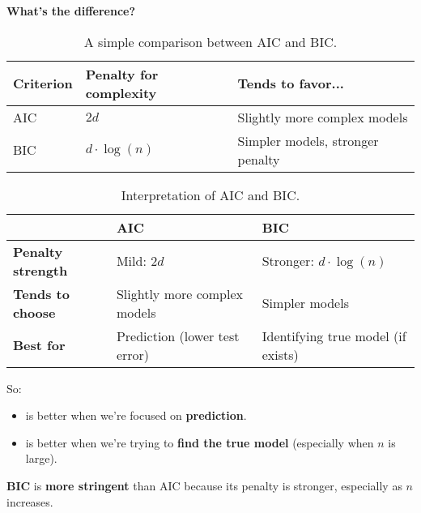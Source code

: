 \highspace
\begin{flushleft}
    \textcolor{Green3}{ \textbf{What's the difference?}}
\end{flushleft}
\begin{table}[!htp]
    \centering
    \begin{tabular}{@{} l l l @{}}
        \toprule
        Criterion & Penalty for complexity & Tends to favor...  \\
        \midrule
        AIC & $2d$          & Slightly more complex models      \\ [.3em]
        BIC & $d \cdot \log(n)$   & Simpler models, stronger penalty  \\
        \bottomrule
    \end{tabular}
    \caption{A simple comparison between AIC and BIC.}
\end{table}

\newpage

\begin{table}[!htp]
    \centering
    \begin{adjustbox}{width={\textwidth},totalheight={\textheight},keepaspectratio}
        \begin{tabular}{@{} l l l @{}}
            \toprule
            & AIC & BIC \\
            \midrule
            \textbf{Penalty strength}   & Mild: $2d$                    & Stronger: $d \cdot \log(n)$           \\ [.3em]
            \textbf{Tends to choose}    & Slightly more complex models  & Simpler models                        \\ [.3em]
            \textbf{Best for}           & Prediction (lower test error) & Identifying true model (if exists)    \\
            \bottomrule
        \end{tabular}
    \end{adjustbox}
    \caption{Interpretation of AIC and BIC.}
\end{table}

\noindent
So:
\begin{itemize}
    \item {} is better when we're focused on \textbf{prediction}.
    \item {} is better when we're trying to \textbf{find the true model} (especially when $n$ is large).
\end{itemize}
\textbf{BIC} is \textbf{more stringent} than AIC because its penalty is stronger, especially as $n$ increases.

